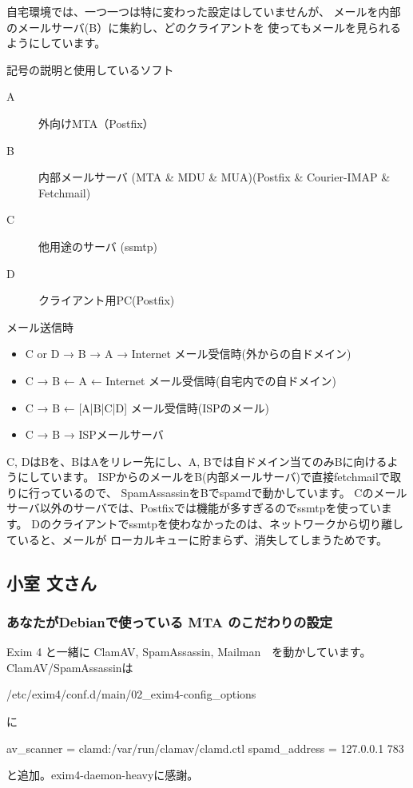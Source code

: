 \documentclass[mingoth,a4paper]{jsarticle}
\begin{document}
自宅環境では、一つ一つは特に変わった設定はしていませんが、
メールを内部のメールサーバ(B）に集約し、どのクライアントを
使ってもメールを見られるようにしています。

記号の説明と使用しているソフト
\begin{description}
\item[A] 外向けMTA（Postfix）
\item[B] 内部メールサーバ 
	(MTA \& MDU \& MUA)(Postfix \& Courier-IMAP \& Fetchmail)
\item[C] 他用途のサーバ (ssmtp)
\item[D] クライアント用PC(Postfix)
\end{description}

メール送信時
\begin{itemize}
\item C or D → B → A → Internet
 メール受信時(外からの自ドメイン)
\item C → B ← A ← Internet
 メール受信時(自宅内での自ドメイン)
\item C → B ← [A|B|C|D]
 メール受信時(ISPのメール)
\item C → B → ISPメールサーバ
\end{itemize}

C, DはBを、BはAをリレー先にし、A, Bでは自ドメイン当てのみBに向けるようにしています。
ISPからのメールをB(内部メールサーバ)で直接fetchmailで取りに行っているので、
SpamAssassinをBでspamdで動かしています。
Cのメールサーバ以外のサーバでは、Postfixでは機能が多すぎるのでssmtpを使っています。
Dのクライアントでssmtpを使わなかったのは、ネットワークから切り離していると、メールが
ローカルキューに貯まらず、消失してしまうためです。

\subsection{小室 文さん}
\subsubsection{あなたがDebianで使っている MTA のこだわりの設定}
Exim 4 と一緒に ClamAV, SpamAssassin, Mailman　を動かしています。
ClamAV/SpamAssassinは
\begin{commandline}
/etc/exim4/conf.d/main/02_exim4-config_options
\end{commandline}
に
\begin{commandline}
av_scanner = clamd:/var/run/clamav/clamd.ctl
spamd_address = 127.0.0.1 783
\end{commandline}
と追加。exim4-daemon-heavyに感謝。
\end{document}
